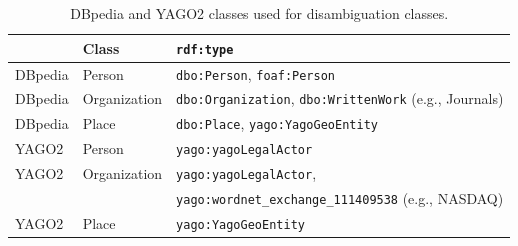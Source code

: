 


\begin{table}[htb!]
\centering
 \begin{tabular}{lll}
	\toprule
\textbf{} & \textbf{Class} & \texttt{\textbf{rdf:type}}\\
\midrule
DBpedia & Person & \texttt{dbo:Person}, \texttt{foaf:Person}\\
DBpedia & Organization & \texttt{dbo:Organization}, \texttt{dbo:WrittenWork} (e.g., Journals) \\
DBpedia & Place & \texttt{dbo:Place}, \texttt{yago:YagoGeoEntity} \\
\midrule
YAGO2 & Person & \texttt{yago:yagoLegalActor}  \\
YAGO2 & Organization & \texttt{yago:yagoLegalActor}, \\
  &   &  \texttt{yago:wordnet\_exchange\_111409538} (e.g., NASDAQ) \\
YAGO2 & Place & \texttt{yago:YagoGeoEntity} \\
\bottomrule

 \end{tabular}
  \caption{DBpedia  and YAGO2 classes used for disambiguation classes.}
  \label{tab:tableOfClasses}
 \end{table}
 
